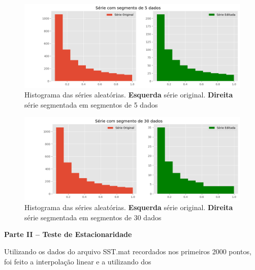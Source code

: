 \documentclass[12pt,a4paper,portuguese]{article}
\begin{document}
	\begin{figure}[H]
		\centering
		\includegraphics[width=0.9\linewidth]{lista2-3d}
		\caption{Histograma das séries aleatórias. \textbf{Esquerda} série original. \textbf{Direita} série segmentada em segmentos de 5 dados}
		\label{fig:lista2-3d}
	\end{figure}
	
	
	\begin{figure}[H]
		\centering
		\includegraphics[width=0.9\linewidth]{lista2-3e}
		\caption{Histograma das séries aleatórias. \textbf{Esquerda} série original. \textbf{Direita} série segmentada em segmentos de 30 dados}
		\label{fig:lista2-3e}
	\end{figure}
	
	\textbf{Parte II – Teste de Estacionaridade}
	
Utilizando os dados do arquivo SST.mat recordados nos primeiros 2000 pontos, foi feito a interpolação linear e a utilizando dos
	
\end{document}
